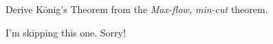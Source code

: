 \question Derive K\"onig's Theorem from the \textit{Max-flow,
min-cut} theorem.

\begin{solution}
  I'm skipping this one. Sorry!
\end{solution}
